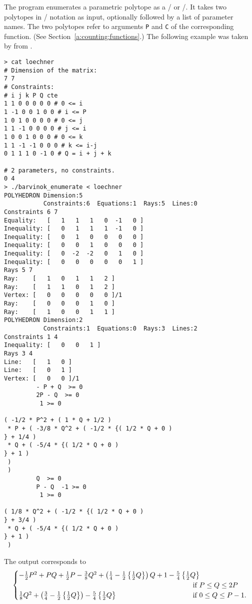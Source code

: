The program  enumerates a
parametric polytope as a \psp/ or \rgf/.  It takes two polytopes in \PolyLib/
notation as input, optionally followed by a list of parameter
names.
The two polytopes refer to arguments \verb+P+ and \verb+C+
of the corresponding function. (See Section~\ref{a:counting:functions}.)
The following example was taken by 
from .
\begin{verbatim}
> cat loechner 
# Dimension of the matrix: 
7 7 
# Constraints: 
# i j k P Q cte 
1 1 0 0 0 0 0 # 0 <= i 
1 -1 0 0 1 0 0 # i <= P 
1 0 1 0 0 0 0 # 0 <= j 
1 1 -1 0 0 0 0 # j <= i
1 0 0 1 0 0 0 # 0 <= k 
1 1 -1 -1 0 0 0 # k <= i-j 
0 1 1 1 0 -1 0 # Q = i + j + k

# 2 parameters, no constraints. 
0 4
> ./barvinok_enumerate < loechner 
POLYHEDRON Dimension:5
           Constraints:6  Equations:1  Rays:5  Lines:0
Constraints 6 7
Equality:   [   1   1   1   0  -1   0 ]
Inequality: [   0   1   1   1  -1   0 ]
Inequality: [   0   1   0   0   0   0 ]
Inequality: [   0   0   1   0   0   0 ]
Inequality: [   0  -2  -2   0   1   0 ]
Inequality: [   0   0   0   0   0   1 ]
Rays 5 7
Ray:    [   1   0   1   1   2 ]
Ray:    [   1   1   0   1   2 ]
Vertex: [   0   0   0   0   0 ]/1
Ray:    [   0   0   0   1   0 ]
Ray:    [   1   0   0   1   1 ]
POLYHEDRON Dimension:2
           Constraints:1  Equations:0  Rays:3  Lines:2
Constraints 1 4
Inequality: [   0   0   1 ]
Rays 3 4
Line:   [   1   0 ]
Line:   [   0   1 ]
Vertex: [   0   0 ]/1
         - P + Q  >= 0
         2P - Q  >= 0
          1 >= 0

( -1/2 * P^2 + ( 1 * Q + 1/2 )
 * P + ( -3/8 * Q^2 + ( -1/2 * {( 1/2 * Q + 0 )
} + 1/4 )
 * Q + ( -5/4 * {( 1/2 * Q + 0 )
} + 1 )
 )
 )
         Q  >= 0
         P - Q  -1 >= 0
          1 >= 0

( 1/8 * Q^2 + ( -1/2 * {( 1/2 * Q + 0 )
} + 3/4 )
 * Q + ( -5/4 * {( 1/2 * Q + 0 )
} + 1 )
 )
\end{verbatim}
The output corresponds to 
$$
\begin{cases}
\makebox[0pt][l]{$-\frac 1 2 P^2 + P Q + \frac 1 2 P - \frac 3 8 Q^2
+ \left( \frac 1 4 - \frac 1 2 \left\{ \frac 1 2 Q \right\} \right)
	       	Q + 1 
- \frac 5 4 \left\{ \frac 1 2 Q \right\}$} \\
&
\hbox{if $P \le Q \le 2 P$}
\\
\frac 1 8 Q^2 + 
\left( \frac 3 4 - \frac 1 2 \left\{ \frac 1 2 Q \right\} \right)
- \frac 5 4 \left\{ \frac 1 2 Q \right\}
\qquad
\qquad
\qquad
\qquad
\qquad
&
\hbox{if $0 \le Q \le P-1$}
.
\end{cases}
$$
